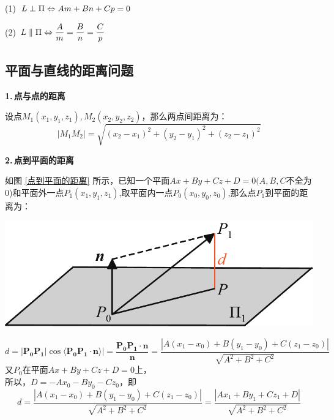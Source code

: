 (1)$\hspace*{0.5em} L\perp \Pi \Leftrightarrow  Am+Bn+Cp=0$
\vspace*{0.5em}

(2)$\hspace*{0.5em} L\parallel \Pi \Leftrightarrow \displaystyle \frac{A}{m}=\frac{B}{n}=\frac{C}{p} $



\newpage
\subsection{平面与直线的距离问题}

\noindent \textbf{1.$\,$点与点的距离}
	
设点$M_1(x_1,y_1,z_1),M_2(x_2,y_2,z_2)$，那么两点间距离为：
\begin{equation}
	|M_1M_2|=\sqrt{(x_2-x_1)^2+(y_2-y_1)^2+(z_2-z_1)^2}
\end{equation}

\noindent
\begin{minipage}{0.6\linewidth}
\textbf{2.$\,$点到平面的距离}

\hspace*{2em}如图 \ref{点到平面的距离} 所示，已知一个平面$Ax+By+Cz+D=0(A,B,C$不全为0)和平面外一点$P_1(x_1,y_1,z_1)$,取平面内一点$P_0(x_0,y_0,z_0)$,那么点$P_1$到平面的距离为：
\end{minipage}
\begin{minipage}{0.4\linewidth}
	\centering
	\includegraphics[width = 0.8\linewidth]{pic/C-5/planed}
	\vspace*{-1em}
	\label{点到平面的距离}
\end{minipage}
\vspace*{-0.5em}

\begin{equation}
	d=|\boldsymbol{P_0P_1}|\cos \langle \boldsymbol{P_0P_1}\cdot \boldsymbol{n} \rangle|=\frac{\boldsymbol{P_0P_1}\cdot \boldsymbol{n}}{\boldsymbol{n}}=\frac{|A(x_1-x_0)+B(y_1-y_0)+C(z_1-z_0)|}{\sqrt{A^2+B^2+C^2}}
\end{equation}
又$P_0$在平面$Ax+By+Cz+D=0$上，\\
所以，$D=-Ax_0-By_0-Cz_0$，即
\begin{equation}
	d=\frac{|A(x_1-x_0)+B(y_1-y_0)+C(z_1-z_0)|}{\sqrt{A^2+B^2+C^2}}=\frac{|Ax_1+By_1+Cz_1+D|}{\sqrt{A^2+B^2+C^2}}
\end{equation}
\vspace*{-2.5em}
\summarize[\hspace*{2em}联想二维空间中点到直线的距离公式进行记忆：
\begin{equation}
	d=\frac{|Ax_1+By_1+C|}{\sqrt{A^2+B^2}}
	\end{equation}]
	
